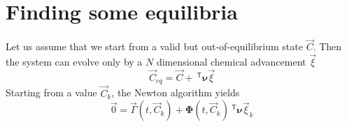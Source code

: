 \documentclass[aps]{revtex4}
\newcommand{\mymat}[1]{\bm{#1}}
\newcommand{\mytrn}[1]{~^{\mathsf{T}}{#1}}
\begin{document}




\section{Finding some equilibria}

Let us assume that we start from a valid but out-of-equilibrium state $\vec{C}$.
Then the system can evolve only by a $N$ dimensional chemical advancement $\vec{\xi}$
\begin{equation}
	\vec{C}_{eq} = \vec{C} + \mytrn{\mymat{\nu}}\vec{\xi}
\end{equation}
Starting from a value $\vec{C}_{k}$, the Newton algorithm yields
\begin{equation}
	\vec{0} = \vec{\Gamma}(t,\vec{C}_k) + \mymat{\Phi}(t,\vec{C}_k) \mytrn{\mymat{\nu}}\vec{\xi}_k
\end{equation}
\end{document}
